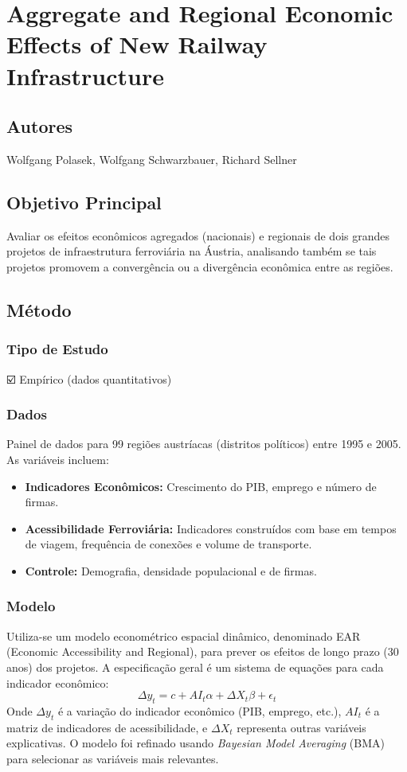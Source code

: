 \documentclass[12pt]{article}
\begin{document}
\newpage

\section{Aggregate and Regional Economic Effects of New Railway Infrastructure}

\subsection*{Autores}
Wolfgang Polasek, Wolfgang Schwarzbauer, Richard Sellner

\subsection*{Objetivo Principal}
Avaliar os efeitos econômicos agregados (nacionais) e regionais de dois grandes projetos de infraestrutura ferroviária na Áustria, analisando também se tais projetos promovem a convergência ou a divergência econômica entre as regiões.

\subsection*{Método}

\subsubsection*{Tipo de Estudo}
☑️ Empírico (dados quantitativos)

\subsubsection*{Dados}
Painel de dados para 99 regiões austríacas (distritos políticos) entre 1995 e 2005. As variáveis incluem:
\begin{itemize}
    \item \textbf{Indicadores Econômicos:} Crescimento do PIB, emprego e número de firmas.
    \item \textbf{Acessibilidade Ferroviária:} Indicadores construídos com base em tempos de viagem, frequência de conexões e volume de transporte.
    \item \textbf{Controle:} Demografia, densidade populacional e de firmas.
\end{itemize}

\subsubsection*{Modelo}
Utiliza-se um modelo econométrico espacial dinâmico, denominado EAR (Economic Accessibility and Regional), para prever os efeitos de longo prazo (30 anos) dos projetos. A especificação geral é um sistema de equações para cada indicador econômico:
$$ \Delta y_{t} = c + AI_{t}\alpha + \Delta X_{t}\beta + \epsilon_{t} $$
Onde $\Delta y_t$ é a variação do indicador econômico (PIB, emprego, etc.), $AI_t$ é a matriz de indicadores de acessibilidade, e $\Delta X_t$ representa outras variáveis explicativas. O modelo foi refinado usando \textit{Bayesian Model Averaging} (BMA) para selecionar as variáveis mais relevantes.
\end{document}
